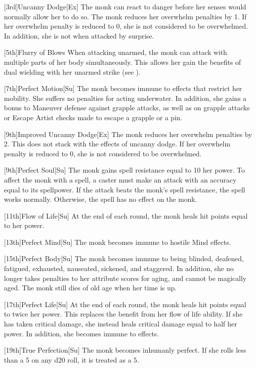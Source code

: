 [3rd]{Uncanny Dodge}[Ex]
The monk can react to danger before her senses would normally allow her to do so.
The monk reduces her overwhelm penalties by 1.
If her overwhelm penalty is reduced to 0, she is not considered to be overwhelmed.
In addition, she is not \unaware when attacked by surprise.

[5th]{Flurry of Blows}
When attacking unarmed, the monk can attack with multiple parts of her body simultaneously.
This allows her gain the benefits of dual wielding with her unarmed strike (see ).

[7th]{Perfect Motion}[Su]
The monk becomes immune to effects that restrict her mobility.
She suffers no penalties for acting underwater.
In addition, she gains a  bonus to Maneuver defense against grapple attacks, as well as on grapple attacks or Escape Artist checks made to escape a grapple or a pin.

[9th]{Improved Uncanny Dodge}[Ex]
The monk reduces her overwhelm penalties by 2.
This does not stack with the effects of uncanny dodge.
If her overwhelm penalty is reduced to 0, she is not considered to be overwhelmed.

[9th]{Perfect Soul}[Su]
The monk gains spell resistance equal to 10 \add her \ki power.
To affect the monk with a spell, a caster must make an attack with an accuracy equal to its spellpower.
If the attack beats the monk's spell resistance, the spell works normally.
Otherwise, the spell has no effect on the monk.

[11th]{Flow of Life}[Su]
At the end of each round, the monk heals hit points equal to her \ki power.

[13th]{Perfect Mind}[Su]
The monk becomes immune to hostile Mind effects.

[15th]{Perfect Body}[Su]
The monk becomes immune to being blinded, deafened, fatigued, exhausted, nauseated, sickened, and staggered.
In addition, she no longer takes penalties to her attribute scores for aging, and cannot be magically aged.
The monk still dies of old age when her time is up.

[17th]{Perfect Life}[Su]
At the end of each round, the monk heals hit points equal to twice her \ki power.
This replaces the benefit from her flow of life ability.
If she has taken critical damage, she instead heals critical damage equal to half her \ki power.
In addition, she becomes immune to  effects.

[19th]{True Perfection}[Su]
The monk becomes inhumanly perfect.
If she rolls less than a 5 on any d20 roll, it is treated as a 5.

